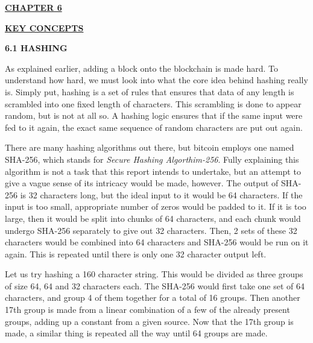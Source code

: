 \documentclass[12pt,a4paper]{report}
\begin{document}
\begin{justify}
\newpage


\begin{center}\underline{ \Large \textbf{CHAPTER 6}}\end{center}
\begin{center}\underline{ \Large \textbf{KEY CONCEPTS}}\end{center}
\vspace{10mm}

\textbf{6.1 HASHING}


As explained earlier, adding a block onto the blockchain is made hard. To understand how hard, we must look into what the core idea behind hashing really is. Simply put, hashing is a set of rules that ensures that data of any length is scrambled into one fixed length of characters. This scrambling is done to appear random, but is not at all so. A hashing logic ensures that if the same input were fed to it again, the exact same sequence of random characters are put out again.
\vspace{10mm}

There are many hashing algorithms out there, but bitcoin employs one named SHA-256, which stands for \textit{Secure Hashing Algorthim-256}. Fully explaining this algorithm is not a task that this report intends to undertake, but an attempt to give a vague sense of its intricacy would be made, however.
\vspace{10mm}
The output of SHA-256 is 32 characters long, but the ideal input to it would be 64 characters. If the input is too small, appropriate number of zeros would be padded to it. If it is too large, then it would be split into chunks of 64 characters, and each chunk would undergo SHA-256 separately to give out 32 characters. Then, 2 sets of these 32 characters would be combined into 64 characters and SHA-256 would be run on it again. This is repeated until there is only one 32 character output left.

\vspace{10mm}

Let us try hashing a 160 character string. This would be divided as three groups of size 64, 64 and 32 characters each. The SHA-256 would first take one set of 64 characters, and group 4 of them together for a total of 16 groups. Then another 17th group is made from a linear combination of a few of the already present groups, adding up a constant from a given source. Now that the 17th group is made, a similar thing is repeated all the way until 64 groups are made. \newline


\end{justify}
\end{document}
